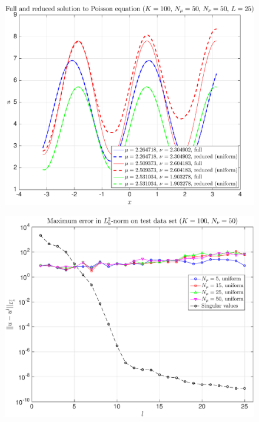 \documentclass[11pt,a4paper]{article}
\theoremstyle{definition}
\theoremstyle{theorem}
\numberwithin{equation}{section}
\begin{document}
	\begin{figure}[H]
		\center
		\includegraphics[scale = 0.5]{fig7}
		\caption{}
	\end{figure}
	
	\begin{figure}[H]
		\center
		\includegraphics[scale = 0.5]{fig8}
		\caption{}
	\end{figure}
	
\end{document}

